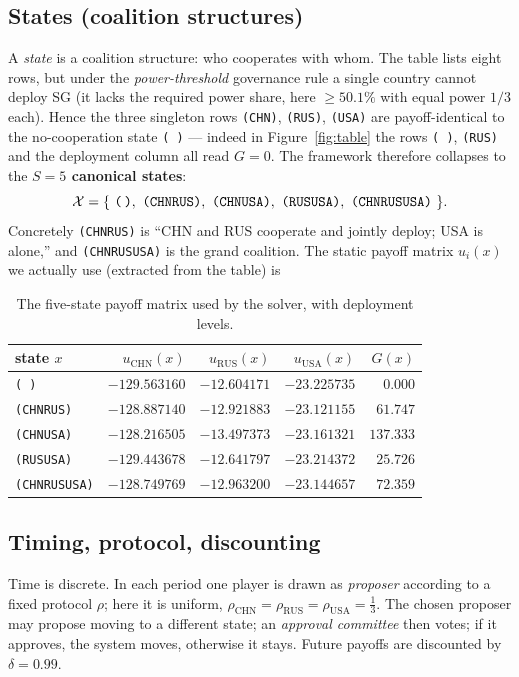 \documentclass[11pt]{article}
\newcommand{\state}[1]{\texttt{(#1)}}
\newcommand{\empt}{\texttt{(\,)}}
\begin{document}
\subsection{States (coalition structures)}
\label{sec:states}
A \emph{state} is a coalition structure: who cooperates with whom. The table lists
eight rows, but under the \emph{power-threshold} governance rule a single country
cannot deploy SG (it lacks the required power share, here $\geq 50.1\%$ with equal
power $1/3$ each). Hence the three singleton rows \state{CHN}, \state{RUS},
\state{USA} are payoff-identical to the no-cooperation state \empt{} --- indeed in
Figure~\ref{fig:table} the rows \empt{}, \state{RUS} and the deployment column all
read $G=0$. The framework therefore collapses to the
\textbf{$S=5$ canonical states}:
\[
\mathcal{X} = \{\ \empt,\ \state{CHNRUS},\ \state{CHNUSA},\ \state{RUSUSA},\ \state{CHNRUSUSA}\ \}.
\]
Concretely \state{CHNRUS} is ``CHN and RUS cooperate and jointly deploy; USA is
alone,'' and \state{CHNRUSUSA} is the grand coalition. The static payoff matrix
$u_i(x)$ we actually use (extracted from the table) is

\begin{table}[h]
\centering
\begin{tabular}{lrrrr}
\toprule
state $x$ & $u_{\text{CHN}}(x)$ & $u_{\text{RUS}}(x)$ & $u_{\text{USA}}(x)$ & $G(x)$\\
\midrule
\empt        & $-129.563160$ & $-12.604171$ & $-23.225735$ & $0.000$\\
\state{CHNRUS}    & $-128.887140$ & $-12.921883$ & $-23.121155$ & $61.747$\\
\state{CHNUSA}    & $-128.216505$ & $-13.497373$ & $-23.161321$ & $137.333$\\
\state{RUSUSA}    & $-129.443678$ & $-12.641797$ & $-23.214372$ & $25.726$\\
\state{CHNRUSUSA} & $-128.749769$ & $-12.963200$ & $-23.144657$ & $72.359$\\
\bottomrule
\end{tabular}
\caption{The five-state payoff matrix used by the solver, with deployment levels.}
\label{tab:payoffs}
\end{table}

\subsection{Timing, protocol, discounting}
Time is discrete. In each period one player is drawn as \emph{proposer} according to
a fixed protocol $\rho$; here it is uniform, $\rho_{\text{CHN}}=\rho_{\text{RUS}}=
\rho_{\text{USA}}=\tfrac13$. The chosen proposer may propose moving to a different
state; an \emph{approval committee} then votes; if it approves, the system moves,
otherwise it stays. Future payoffs are discounted by $\delta=0.99$.
\end{document}
